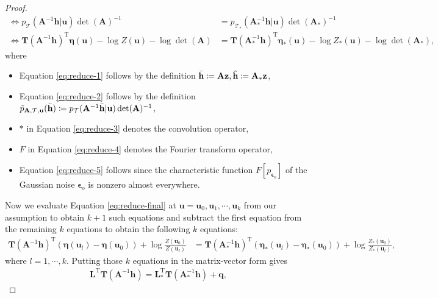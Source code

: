 \documentclass{article} %
\theoremstyle{plain}
\theoremstyle{definition}
\theoremstyle{remark}
\begin{document}
\begin{proof}
\begin{align}
        \iff p_{\mathcal{T}}(\mathbf{A}^{-1}\mathbf{h}|\mathbf{u})\det(\mathbf{A})^{-1} &= p_{\mathcal{T}_{*}}(\mathbf{A}_{*}^{-1}\mathbf{h}|\mathbf{u})\det(\mathbf{A}_{*})^{-1}\\
        \iff \mathbf{T}(\mathbf{A}^{-1}\mathbf{h})^{\text{T}}\boldsymbol{\eta}(\mathbf{u})-\log Z(\mathbf{u})-\log\det(\mathbf{A}) &= \mathbf{T}(\mathbf{A}_{*}^{-1}\mathbf{h})^{\text{T}}\boldsymbol{\eta}_{*}(\mathbf{u})-\log Z_*(\mathbf{u})-\log\det(\mathbf{A}_{*}),\label{eq:reduce-final}
    \end{align}
    where
    \begin{itemize}
        \item Equation \eqref{eq:reduce-1} follows by the definition $\Bar{\mathbf{h}}\coloneqq\mathbf{A}\mathbf{z},\Hat{\mathbf{h}}\coloneqq\mathbf{A}_{*}\mathbf{z}$,
        \item Equation \eqref{eq:reduce-2} follows by the definition $\Tilde{p}_{\mathbf{A},\mathcal{T},\mathbf{u}}(\Bar{\mathbf{h}})\coloneqq p_{\mathcal{T}}(\mathbf{A}^{-1}\Bar{\mathbf{h}}|\mathbf{u})\det(\mathbf{A})^{-1}$,
        \item $*$ in Equation \eqref{eq:reduce-3} denotes the convolution operator,
        \item $F$ in Equation \eqref{eq:reduce-4} denotes the Fourier transform operator,
        \item Equation \eqref{eq:reduce-5} follows since the characteristic function $F[p_{\boldsymbol{\epsilon}_o}]$ of the Gaussian noise $\boldsymbol{\epsilon}_o$ is nonzero almost everywhere.
    \end{itemize}
    Now we evaluate Equation \ref{eq:reduce-final} at $\mathbf{u}=\mathbf{u}_0,\mathbf{u}_1,\cdots,\mathbf{u}_k$ from our assumption to obtain $k+1$ such equations and subtract the first equation from the remaining $k$ equations to obtain the following $k$ equations:
    \begin{align}
        \mathbf{T}(\mathbf{A}^{-1}\mathbf{h})^{\text{T}}(\boldsymbol{\eta}(\mathbf{u}_l)-\boldsymbol{\eta}(\mathbf{u}_0))+\log \frac{Z(\mathbf{u}_0)}{Z(\mathbf{u}_l)} &= \mathbf{T}(\mathbf{A}_{*}^{-1}\mathbf{h})^{\text{T}}(\boldsymbol{\eta}_{*}(\mathbf{u}_l)-\boldsymbol{\eta}_{*}(\mathbf{u}_0))+\log \frac{Z_*(\mathbf{u}_0)}{Z_*(\mathbf{u}_l)},
    \end{align}
    where $l=1,\cdots,k$. Putting those $k$ equations in the matrix-vector form gives
    \begin{align}
        \mathbf{L}^{\text{T}}\mathbf{T}(\mathbf{A}^{-1}\mathbf{h})=\mathbf{L}_{*}^{\text{T}}\mathbf{T}(\mathbf{A}_{*}^{-1}\mathbf{h}) +\mathbf{q},\label{eq:ivae-lin-wip}

\end{align}
\end{proof}
\end{document}
